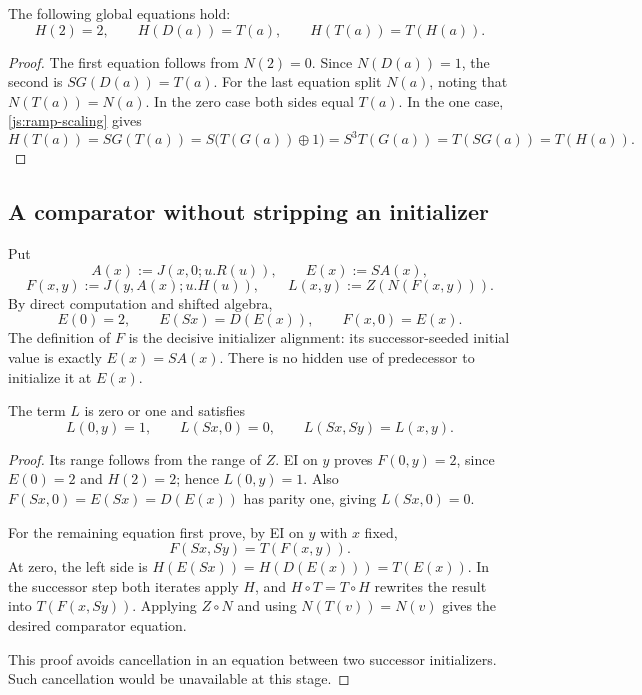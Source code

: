 \begin{lemma}\label{js:factor}
The following global equations hold:
\[
 H(2)=2,\qquad H(D(a))=T(a),\qquad H(T(a))=T(H(a)).
 \tag{Factor}\label{js:factor-equations}
\]
\end{lemma}
\begin{proof}
The first equation follows from $N(2)=0$.  Since $N(D(a))=1$,
the second is $S G(D(a))=T(a)$.
For the last equation split $N(a)$, noting that $N(T(a))=N(a)$.
In the zero case both sides equal $T(a)$.  In the one case,
\eqref{js:ramp-scaling} gives
\[
 H(T(a))=S G(T(a))
 =S\bigl(T(G(a))\oplus1\bigr)
 =S^3T(G(a))=T(SG(a))=T(H(a)).
\]
\end{proof}

\subsection{A comparator without stripping an initializer}

Put
\[
 A(x):=J(x,0;u.R(u)),\qquad E(x):=S A(x),
\]
\[
 F(x,y):=J(y,A(x);u.H(u)),\qquad
 L(x,y):=Z(N(F(x,y))).
\]
By direct computation and shifted algebra,
\[
 E(0)=2,\qquad E(Sx)=D(E(x)),\qquad F(x,0)=E(x).
\]
The definition of $F$ is the decisive initializer alignment:
its successor-seeded initial value is exactly $E(x)=S A(x)$.
There is no hidden use of predecessor to initialize it at $E(x)$.

\begin{lemma}\label{js:comparator}
The term $L$ is zero or one and satisfies
\[
 L(0,y)=1,\qquad L(Sx,0)=0,\qquad
 L(Sx,Sy)=L(x,y).
 \tag{Comparator}\label{js:comparator-equations}
\]
\end{lemma}
\begin{proof}
Its range follows from the range of $Z$.  EI on $y$ proves
$F(0,y)=2$, since $E(0)=2$ and $H(2)=2$; hence $L(0,y)=1$.
Also $F(Sx,0)=E(Sx)=D(E(x))$ has parity one, giving
$L(Sx,0)=0$.

For the remaining equation first prove, by EI on $y$ with $x$ fixed,
\[
 F(Sx,Sy)=T(F(x,y)).
\]
At zero, the left side is
$H(E(Sx))=H(D(E(x)))=T(E(x))$.  In the successor step both
iterates apply $H$, and $H\circ T=T\circ H$ rewrites the result
into $T(F(x,Sy))$.  Applying $Z\circ N$ and using
$N(T(v))=N(v)$ gives the desired comparator equation.

This proof avoids cancellation in an equation between two successor
initializers.  Such cancellation would be unavailable at this stage.
\end{proof}

